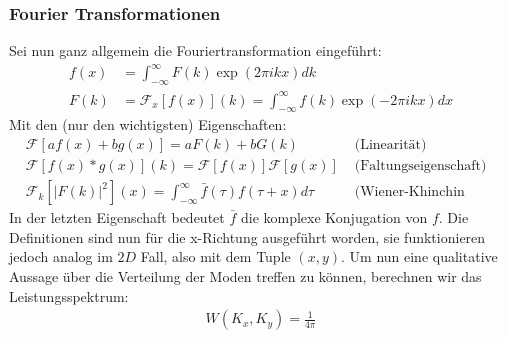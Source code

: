 \subsubsection{Fourier Transformationen}
Sei nun ganz allgemein die Fouriertransformation eingeführt:
\begin{align}
f(x) &= \int_{-\infty}^{\infty} F(k)\exp(2\pi i kx)dk\\
F(k) &= \mathcal{F}_x\left [f(x)\right ](k) =
\int_{-\infty}^{\infty} f(k)\exp(-2\pi i kx)dx
\end{align}
Mit den (nur den wichtigsten) Eigenschaften:
\begin{align}
&\mathcal{F}\left [a f(x) + b g(x)\right ]
    = a F(k) + b G(k) 
    &\mbox{ (Linearität) }\\
&\mathcal{F}\left [f(x) * g(x)\right ](k)
    = \mathcal{F}\left [f(x)\right ]\mathcal{F}\left [g(x)\right ]
    \! &\mbox{ (Faltungseigenschaft) }\\
&\mathcal{F}_k\left [\left | F(k) \right |^2\right ](x)
   =  \int_{-\infty}^{\infty}\bar{f}(\tau)f(\tau + x) d\tau 
   &\mbox{ (Wiener-Khinchin Theorem) }
\end{align}
In der letzten Eigenschaft
bedeutet $\bar{f}$ die komplexe Konjugation von $f$.
Die Definitionen sind nun für die x-Richtung ausgeführt worden,
sie funktionieren jedoch analog im $2D$ Fall, also mit dem Tuple
$(x,y)$. 
Um nun eine qualitative Aussage über die Verteilung der Moden
treffen zu können, berechnen wir das Leistungsspektrum:
\begin{align}
    W(K_x,K_y)=\frac{1}{4\pi}
\end{align}

